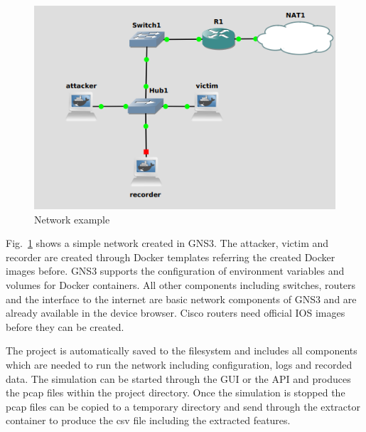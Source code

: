 \documentclass[conference]{IEEEtran}
\begin{document}
\begin{figure}[htbp]
\centerline{\includegraphics[scale=0.5]{network.png}}
\caption{Network example}
\label{network}
\end{figure}

Fig.~\ref{network} shows a simple network created in GNS3. The attacker, victim and recorder are created through Docker templates referring the created Docker images before. GNS3 supports the configuration of environment variables and volumes for Docker containers. All other components including switches, routers and the interface to the internet are basic network components of GNS3 and are already available in the device browser. Cisco routers need official IOS images before they can be created.

The project is automatically saved to the filesystem and includes all components which are needed to run the network including configuration, logs and recorded data. The simulation can be started through the GUI or the API and produces the pcap files within the project directory. Once the simulation is stopped the pcap files can be copied to a temporary directory and send through the extractor container to produce the csv file including the extracted features.
\end{document}
